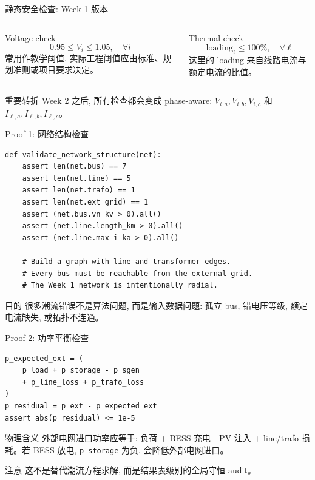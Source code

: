 \documentclass[aspectratio=169,10pt]{ctexbeamer}
\newcommand{\code}[1]{\texttt{#1}}
\begin{document}
\begin{frame}{静态安全检查: Week 1 版本}
\begin{columns}[T]
\begin{block}{Voltage check}
\begin{equation*}
0.95 \le V_i \le 1.05, \quad \forall i
\end{equation*}
常用作教学阈值, 实际工程阈值应由标准、规划准则或项目要求决定。
\end{block}
\begin{block}{Thermal check}
\begin{equation*}
\text{loading}_\ell \le 100\%, \quad \forall \ell
\end{equation*}
这里的 loading 来自线路电流与额定电流的比值。
\end{block}
\end{columns}
\vspace{0.8em}
\begin{alertblock}{重要转折}
Week 2 之后, 所有检查都会变成 phase-aware: $V_{i,a},V_{i,b},V_{i,c}$ 和 $I_{\ell,a},I_{\ell,b},I_{\ell,c}$。
\end{alertblock}
\end{frame}

\begin{frame}[fragile]{Proof 1: 网络结构检查}
\begin{lstlisting}
def validate_network_structure(net):
    assert len(net.bus) == 7
    assert len(net.line) == 5
    assert len(net.trafo) == 1
    assert len(net.ext_grid) == 1
    assert (net.bus.vn_kv > 0).all()
    assert (net.line.length_km > 0).all()
    assert (net.line.max_i_ka > 0).all()

    # Build a graph with line and transformer edges.
    # Every bus must be reachable from the external grid.
    # The Week 1 network is intentionally radial.
\end{lstlisting}
\begin{block}{目的}
很多潮流错误不是算法问题, 而是输入数据问题: 孤立 bus, 错电压等级, 额定电流缺失, 或拓扑不连通。
\end{block}
\end{frame}

\begin{frame}[fragile]{Proof 2: 功率平衡检查}
\begin{lstlisting}
p_expected_ext = (
    p_load + p_storage - p_sgen
    + p_line_loss + p_trafo_loss
)
p_residual = p_ext - p_expected_ext
assert abs(p_residual) <= 1e-5
\end{lstlisting}
\begin{block}{物理含义}
外部电网进口功率应等于: 负荷 + BESS 充电 - PV 注入 + line/trafo 损耗。若 BESS 放电, \code{p\_storage} 为负, 会降低外部电网进口。
\end{block}
\begin{alertblock}{注意}
这不是替代潮流方程求解, 而是结果表级别的全局守恒 audit。
\end{alertblock}
\end{frame}
\end{document}
